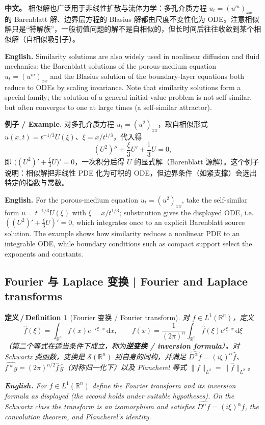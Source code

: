 \documentclass[UTF8,11pt,a4paper]{ctexart}
\newcommand{\APS}[2]{\par\noindent\textbf{中文。} #1\par\noindent\textbf{English.} #2\par\smallskip}
\newcommand{\EN}[1]{\par\noindent \textbf{English.} #1\par}
\newcommand{\EX}[2]{\par\noindent \textbf{例子 / Example.} #1\par\EN{#2}}
\newtheorem{definition}{定义\,/\,Definition}[section]
\newcommand{\R}{\mathbb{R}}
\newcommand{\dd}{\mathrm{d}}
\begin{document}
\APS{相似解也广泛用于非线性扩散与流体力学：多孔介质方程 $u_t=(u^m)_{xx}$ 的 Barenblatt 解、边界层方程的 Blasius 解都由尺度不变性化为 ODE。注意相似解只是``特解族''，一般初值问题的解不是自相似的，但长时间后往往收敛到某个相似解（自相似吸引子）。}{Similarity solutions are also widely used in nonlinear diffusion and fluid mechanics: the Barenblatt solutions of the porous-medium equation $u_t=(u^m)_{xx}$ and the Blasius solution of the boundary-layer equations both reduce to ODEs by scaling invariance. Note that similarity solutions form a special family; the solution of a general initial-value problem is not self-similar, but often converges to one at large times (a self-similar attractor).}

\EX{对多孔介质方程 $u_t=(u^2)_{xx}$，取自相似形式 $u(x,t)=t^{-1/3}U(\xi)$、$\xi=x/t^{1/3}$，代入得
\[
(U^2)''+\frac{\xi}{3}U'+\frac13U=0,
\]
即 $\bigl((U^2)'+\frac{\xi}{3}U\bigr)'=0$，一次积分后得 $U$ 的显式解（Barenblatt 源解）。这个例子说明：相似解把非线性 PDE 化为可积的 ODE，但边界条件（如紧支撑）会选出特定的指数与常数。}{For the porous-medium equation $u_t=(u^2)_{xx}$, take the self-similar form $u=t^{-1/3}U(\xi)$ with $\xi=x/t^{1/3}$; substitution gives the displayed ODE, i.e. $((U^2)'+\frac{\xi}{3}U)'=0$, which integrates once to an explicit Barenblatt source solution. The example shows how similarity reduces a nonlinear PDE to an integrable ODE, while boundary conditions such as compact support select the exponents and constants.}

\subsection{Fourier 与 Laplace 变换 | Fourier and Laplace transforms}
\begin{definition}[Fourier 变换 / Fourier transform]\label{def:fourier}
对 $f\in L^1(\R^n)$，定义
\[
\widehat f(\xi)=\int_{\R^n}f(x)e^{-i\xi\cdot x}\,\dd x,\qquad
f(x)=\frac{1}{(2\pi)^n}\int_{\R^n}\widehat f(\xi)e^{i\xi\cdot x}\,\dd\xi
\]
（第二个等式在适当条件下成立，称为\textbf{逆变换 / inversion formula}）。对 Schwartz 类函数，变换是 $\mathcal S(\R^n)$ 到自身的同构，并满足 $\widehat{D^\alpha f}=(i\xi)^\alpha\widehat f$、$\widehat{f*g}=(2\pi)^{n/2}\widehat f\,\widehat g$（对称归一化下）以及 Plancherel 等式 $\|f\|_{L^2}=\|\widehat f\|_{L^2}$。
\EN{For $f\in L^1(\R^n)$ define the Fourier transform and its inversion formula as displayed (the second holds under suitable hypotheses). On the Schwartz class the transform is an isomorphism and satisfies $\widehat{D^\alpha f}=(i\xi)^\alpha\widehat f$, the convolution theorem, and Plancherel's identity.}
\end{definition}
\end{document}
